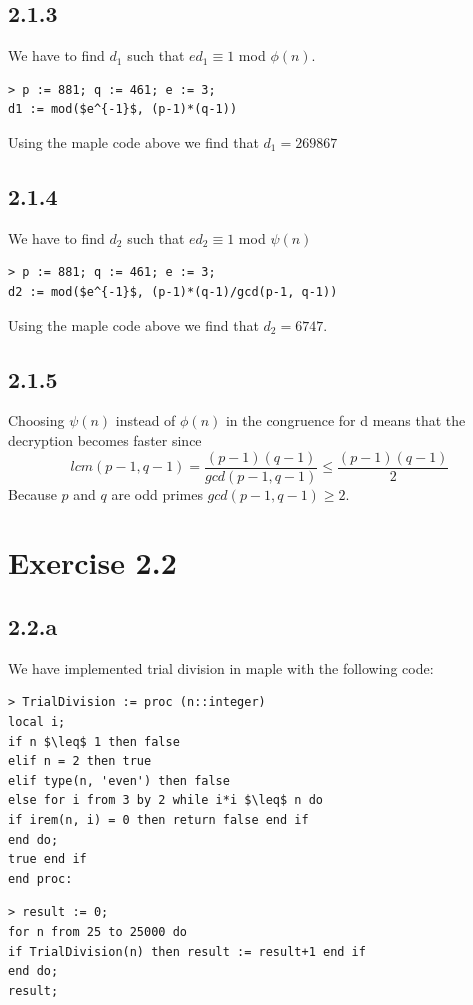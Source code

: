 \documentclass[11pt]{report}
\begin{document}
\subsection*{2.1.3}
We have to find $d_1$ such that $ed_1 \equiv 1$ mod $\phi(n)$.

\begin{lstlisting}[style=Maple]
> p := 881; q := 461; e := 3;
d1 := mod($e^{-1}$, (p-1)*(q-1))
\end{lstlisting}

Using the maple code above we find that $d_1 = 269867$
\subsection*{2.1.4}
We have to find $d_2$ such that $ed_2 \equiv 1$ mod $\psi(n)$

\begin{lstlisting}[style=Maple]
> p := 881; q := 461; e := 3;
d2 := mod($e^{-1}$, (p-1)*(q-1)/gcd(p-1, q-1))
\end{lstlisting}

Using the maple code above we find that $d_2 = 6747$.
\subsection*{2.1.5}
Choosing $\psi(n)$ instead of $\phi(n)$ in the congruence for d means that the decryption becomes faster since
$$lcm(p-1,q-1)=\frac{(p-1)(q-1)}{gcd(p-1,q-1)} \leq \frac{(p-1)(q-1)}{2}$$
Because $p$ and $q$ are odd primes $gcd(p-1,q-1) \geq 2$. 

\section*{Exercise 2.2}
\subsection*{2.2.a}
We have implemented trial division in maple with the following code:

\begin{lstlisting}[style=Maple]
> TrialDivision := proc (n::integer)
local i;
if n $\leq$ 1 then false
elif n = 2 then true
elif type(n, 'even') then false
else for i from 3 by 2 while i*i $\leq$ n do
if irem(n, i) = 0 then return false end if
end do;
true end if
end proc:
\end{lstlisting}

\begin{lstlisting}[style=Maple]
> result := 0;
for n from 25 to 25000 do
if TrialDivision(n) then result := result+1 end if
end do;
result;
\end{lstlisting}
\end{document}
